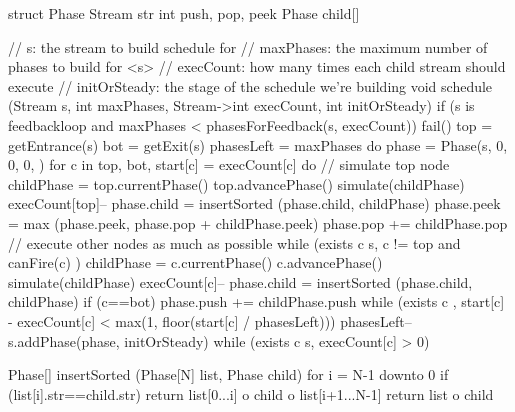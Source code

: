 struct Phase {
  Stream str
  int push, pop, peek
  Phase child[]
}

// s: the stream to build schedule for
// maxPhases:  the maximum number of phases to build for <s>
// execCount:  how many times each child stream should execute
// initOrSteady:  the stage of the schedule we're building
void schedule (Stream s, int maxPhases, Stream->int execCount, int initOrSteady) {
  if (s is feedbackloop and maxPhases < phasesForFeedback(s, execCount))
    fail()
  top = getEntrance(s)
  bot = getExit(s)
  phasesLeft = maxPhases
  do {
    phase = Phase(s, 0, 0, 0, {})
    for c in {top, bot}, start[c] = execCount[c]
    do {
      // simulate top node
      childPhase = top.currentPhase()
      top.advancePhase()
      simulate(childPhase)
      execCount[top]--
      phase.child = insertSorted (phase.child, childPhase)
      phase.peek = max (phase.peek, phase.pop + childPhase.peek)
      phase.pop += childPhase.pop
      // execute other nodes as much as possible
      while (exists c \in s, c != top and canFire(c) ) {
        childPhase = c.currentPhase()
        c.advancePhase()
        simulate(childPhase)
        execCount[c]--
        phase.child = insertSorted (phase.child, childPhase)
        if (c==bot)
          phase.push += childPhase.push
      }
    } while (exists c , start[c] - execCount[c] < max(1, floor(start[c] / phasesLeft)))
    phasesLeft--
    s.addPhase(phase, initOrSteady)
  } while (exists c \in s, execCount[c] > 0)
}

Phase[] insertSorted (Phase[N] list, Phase child) {
  for i = N-1 downto 0
    if (list[i].str==child.str)
      return list[0...i] o child o list[i+1...N-1]
  return list o child
}
